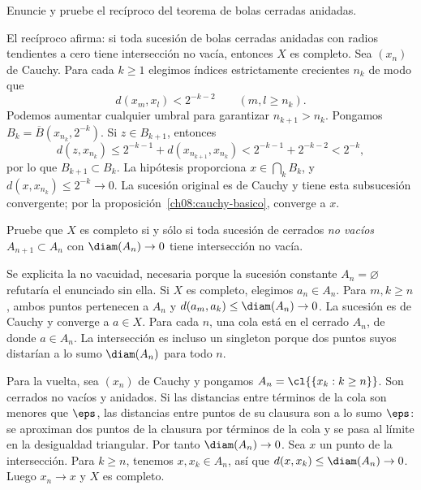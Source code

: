\begin{ejercicio}\label{ej:lectura-10-2}
Enuncie y pruebe el recíproco del teorema de bolas cerradas anidadas.
\end{ejercicio}
\begin{solucion}
El recíproco afirma: si toda sucesión de bolas cerradas anidadas con radios tendientes a cero tiene intersección no vacía, entonces $X$ es completo. Sea $(x_n)$ de Cauchy. Para cada $k\geq1$ elegimos índices estrictamente crecientes $n_k$ de modo que
\[
 d(x_m,x_l)<2^{-k-2}\qquad(m,l\geq n_k).
\]
Podemos aumentar cualquier umbral para garantizar $n_{k+1}>n_k$. Pongamos $B_k=\overline B(x_{n_k},2^{-k})$. Si $z\in B_{k+1}$, entonces
\[
 d(z,x_{n_k})\leq2^{-k-1}+d(x_{n_{k+1}},x_{n_k})
 <2^{-k-1}+2^{-k-2}<2^{-k},
\]
por lo que $B_{k+1}\subset B_k$. La hipótesis proporciona $x\in\bigcap_kB_k$, y $d(x,x_{n_k})\leq2^{-k}\to0$. La sucesión original es de Cauchy y tiene esta subsucesión convergente; por la proposición~\ref{ch08:cauchy-basico}, converge a $x$.
\end{solucion}

\begin{ejercicio}\label{ej:lectura-10-3}
Pruebe que $X$ es completo si y sólo si toda sucesión de cerrados \emph{no vacíos} $A_{n+1}\subset A_n$ con $\diam(A_n)\to0$ tiene intersección no vacía.
\end{ejercicio}
\begin{solucion}
Se explicita la no vacuidad, necesaria porque la sucesión constante $A_n=\varnothing$ refutaría el enunciado sin ella. Si $X$ es completo, elegimos $a_n\in A_n$. Para $m,k\geq n$, ambos puntos pertenecen a $A_n$ y $d(a_m,a_k)\leq\diam(A_n)\to0$. La sucesión es de Cauchy y converge a $a\in X$. Para cada $n$, una cola está en el cerrado $A_n$, de donde $a\in A_n$. La intersección es incluso un singleton porque dos puntos suyos distarían a lo sumo $\diam(A_n)$ para todo $n$.

Para la vuelta, sea $(x_n)$ de Cauchy y pongamos $A_n=\cl{\{x_k:k\geq n\}}$. Son cerrados no vacíos y anidados. Si las distancias entre términos de la cola son menores que $\eps$, las distancias entre puntos de su clausura son a lo sumo $\eps$: se aproximan dos puntos de la clausura por términos de la cola y se pasa al límite en la desigualdad triangular. Por tanto $\diam(A_n)\to0$. Sea $x$ un punto de la intersección. Para $k\geq n$, tenemos $x,x_k\in A_n$, así que $d(x,x_k)\leq\diam(A_n)\to0$. Luego $x_n\to x$ y $X$ es completo.
\end{solucion}

